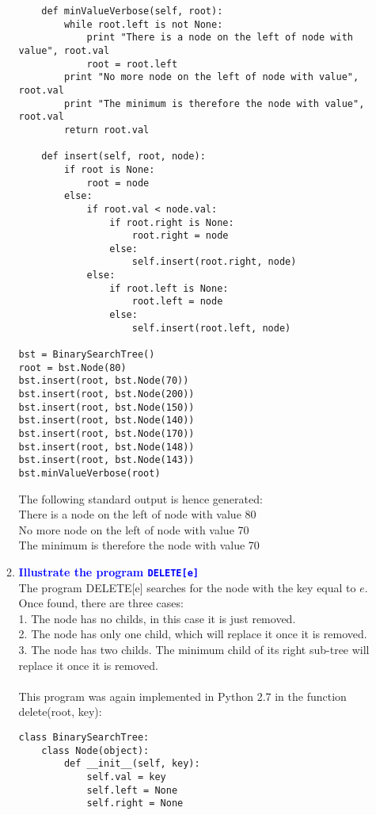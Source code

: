 \documentclass[11pt]{article}
\begin{document}
\begin{enumerate}
\begin{enumerate}
\begin{verbatim}
    def minValueVerbose(self, root):
        while root.left is not None:
            print "There is a node on the left of node with value", root.val
            root = root.left    
        print "No more node on the left of node with value", root.val
        print "The minimum is therefore the node with value", root.val
        return root.val
        
    def insert(self, root, node):
        if root is None:
            root = node
        else:
            if root.val < node.val:
                if root.right is None:
                    root.right = node
                else:
                    self.insert(root.right, node)
            else:
                if root.left is None:
                    root.left = node
                else:
                    self.insert(root.left, node)
            
bst = BinarySearchTree()
root = bst.Node(80)
bst.insert(root, bst.Node(70))
bst.insert(root, bst.Node(200))
bst.insert(root, bst.Node(150))
bst.insert(root, bst.Node(140))
bst.insert(root, bst.Node(170))
bst.insert(root, bst.Node(148))
bst.insert(root, bst.Node(143))
bst.minValueVerbose(root)
        \end{verbatim}
        The following standard output is hence generated:
        \\ There is a node on the left of node with value 80
        \\ No more node on the left of node with value 70
        \\ The minimum is therefore the node with value 70
    \item \textbf{\textcolor{blue}{Illustrate the program {\tt DELETE[e]}}}
        \\ The program DELETE[e] searches for the node with the key equal to $e$.
        \\ Once found, there are three cases:
        \\ 1. The node has no childs, in this case it is just removed.
        \\ 2. The node has only one child, which will replace it once it is removed.
        \\ 3. The node has two childs. The minimum child of its right sub-tree will replace it once it is removed.
        \\\\ This program was again implemented in Python 2.7 in the function delete(root, key):
        \begin{verbatim}
class BinarySearchTree:
    class Node(object):
        def __init__(self, key):
            self.val = key
            self.left = None
            self.right = None
        

\end{verbatim}
\end{enumerate}
\end{enumerate}
\end{document}
